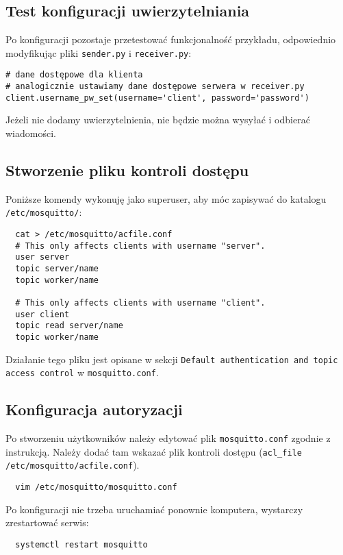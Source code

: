 \documentclass[10pt,a4paper]{article}
\begin{document}
\subsection{Test konfiguracji uwierzytelniania}
Po konfiguracji pozostaje przetestować funkcjonalność przykładu, odpowiednio modyfikując pliki \texttt{sender.py} i \texttt{receiver.py}:

\begin{verbatim}
# dane dostępowe dla klienta
# analogicznie ustawiamy dane dostępowe serwera w receiver.py
client.username_pw_set(username='client', password='password')
\end{verbatim}

Jeżeli nie dodamy uwierzytelnienia, nie będzie można wysyłać i odbierać wiadomości.

\subsection{Stworzenie pliku kontroli dostępu}
Poniższe komendy wykonuję jako superuser, aby móc zapisywać do katalogu \texttt{/etc/mosquitto/}:

\begin{verbatim}
  cat > /etc/mosquitto/acfile.conf
  # This only affects clients with username "server".
  user server
  topic server/name
  topic worker/name

  # This only affects clients with username "client".
  user client
  topic read server/name
  topic worker/name
\end{verbatim}

Działanie tego pliku jest opisane w sekcji \texttt{Default authentication and topic access control} w \texttt{mosquitto.conf}.

\subsection{Konfiguracja autoryzacji}
Po stworzeniu użytkowników należy edytować plik \texttt{mosquitto.conf} zgodnie z instrukcją.
Należy dodać tam wskazać plik kontroli dostępu (\texttt{acl\_file /etc/mosquitto/acfile.conf}).

\begin{verbatim}
  vim /etc/mosquitto/mosquitto.conf
\end{verbatim}

Po konfiguracji nie trzeba uruchamiać ponownie komputera, wystarczy zrestartować serwis:

\begin{verbatim}
  systemctl restart mosquitto
\end{verbatim}
\end{document}
